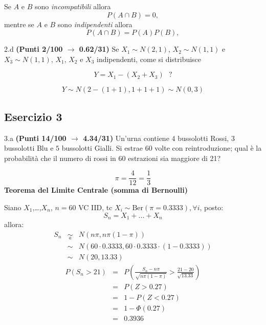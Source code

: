 \documentclass[
  11pt,
]{book}
\theoremstyle{mytheoremstyle}
\theoremstyle{mydefstyle}
\newenvironment{sol}
  {
  \begin{tcolorbox}[enhanced,breakable,arc=0.1mm,boxrule=1pt,colback=white,colframe=iblue,
  title=\bf \fontfamily{lmss}\selectfont \hspace{.5 cm} Soluzione,drop fuzzy shadow]

}{
\end{tcolorbox}
  }
\begin{document}
\begin{sol}
Se \(A\) e \(B\) sono \emph{incompatibili} allora
\[
P(A\cap B)=0,
\]
mentre se \(A\) e \(B\) sono \emph{indipendenti} allora
\[
P(A\cap B)=P(A)P(B),
\]

\end{sol}

2.d \textbf{(Punti 2/100 \(\rightarrow\) 0.62/31)} Se \(X_1\sim N(2,1)\), \(X_2\sim N(1,1)\) e \(X_3\sim N(1,1)\),
\(X_1\), \(X_2\) e \(X_3\) indipendenti, come si distribuisce

\[
  Y=X_1-(X_2+X_3) ~~~?
\]

\begin{sol}
\[Y\sim N(2-(1+1),1+1+1)\sim N(0,3)\]

\end{sol}

\subsection{Esercizio 3}\label{esercizio-3-3}

3.a \textbf{(Punti 14/100 \(\rightarrow\) 4.34/31)} Un'urna contiene \(4\) bussolotti Rossi, \(3\) bussolotti Blu e \(5\) bussolotti Gialli. Si estrae 60 volte con reintroduzione; qual è la probabilità che il numero di rossi in 60 estrazioni sia maggiore di 21?

\begin{sol}
\[\pi=\frac 4{12}=\frac 13\]
\textbf{Teorema del Limite Centrale (somma di Bernoulli)}

Siano \(X_1\),\ldots,\(X_n\), \(n=60\) VC IID, tc \(X_i\sim\text{Ber}(\pi=0.3333)\)\(,\forall i\), posto:
\[
      S_n = X_1 + ... + X_n
      \]
allora:\begin{eqnarray*}
  S_n & \mathop{\sim}\limits_{a}& N(n\pi,n\pi(1-\pi)) \\
      &\sim & N(60\cdot0.3333,60\cdot0.3333\cdot(1-0.3333)) \\
      &\sim & N(20,13.33)
  \end{eqnarray*}\begin{eqnarray*}
      P( S_n   >   21 ) 
        &=& P\left(  \frac { S_n  -  n\pi }{ \sqrt{n\pi(1-\pi)} }  >  \frac { 21  -  20 }{\sqrt{ 13.33 }} \right)  \\
                 &=& P\left(  Z   >   0.27 \right) \\    &=& 1-P(Z< 0.27 )\\ 
                 &=&  1-\Phi( 0.27 ) \\ &=&  0.3936 
      \end{eqnarray*}

\end{sol}
\end{document}
